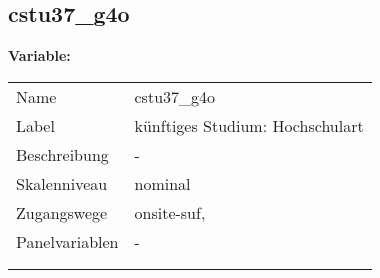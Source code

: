 	
	
	\subsection{cstu37\_g4o}
	\label{subSection:cstu37_g4o}

	\noindent\textbf{Variable:}\\
		\begin{tabular}{lL{11.3cm}}
			\label{tableVariable:cstu37_g4o}
			Name & cstu37\_g4o \\
			Label & künftiges Studium: Hochschulart \\
			Beschreibung & - \\
			Skalenniveau & nominal \\
			Zugangswege &
				onsite-suf,
 \\
			Panelvariablen & -
			 \\
			 \\
 \\
		\end{tabular}






